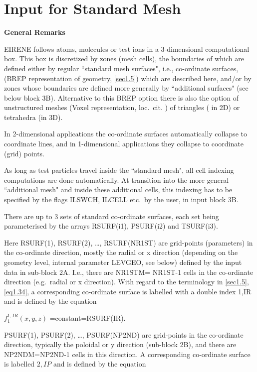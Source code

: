 \section{Input for Standard Mesh} \label{sec2.2}

\textbf{General Remarks} 

\medskip 

EIRENE follows atoms, molecules or test ions in a 3-dimensional computational
box.
This box is discretized by zones (mesh cells), the boundaries of which are
defined either by regular ``standard mesh surfaces", i.e., co-ordinate
surfaces, (\ac{BREP} representation of geometry, \cref{sec1.5}) which are
described here, and/or by zones whose boundaries are defined more generally by
``additional surfaces" (see below block 3B).
Alternative to this \ac{BREP} option there is also the option of unstructured
meshes (Voxel representation, loc.\ cit.
) of triangles ( in 2D) or tetrahedra
(in 3D).

In 2-dimensional applications the co-ordinate surfaces automatically collapse
to coordinate lines, and in 1-dimensional applications they collapse to
coordinate (grid) points.

As long as test particles travel inside the ``standard mesh", all cell indexing
computations are done automatically.
At transition into the more general ``additional mesh" and inside these
additional cells, this indexing has to be specified by the flags ILSWCH, ILCELL
etc.\ by the user, in input block 3B.

There are up to 3 sets of standard co-ordinate surfaces, each set being
parameterised by the arrays RSURF(i1), PSURF(i2) and TSURF(i3).

Here RSURF(1), RSURF(2), \dots, RSURF(NR1ST) are grid-points (parameters) in
the  co-ordinate direction, mostly the radial or x direction
(depending on the geometry level, internal parameter LEVGEO, see below) defined
by the input data in sub-block 2A.
I.e., there are NR1STM= NR1ST-1 cells in the  co-ordinate
direction (e.g.\ radial or x direction).
With regard to the terminology in \cref{sec1.5}, \cref{eq1.34}, a corresponding
co-ordinate surface is labelled with a double index 1,IR and is defined by the
equation 

$f_1^{1,IR} (x,y,z)$ =constant=RSURF(IR).

PSURF(1), PSURF(2), \dots, PSURF(NP2ND) are grid-points in the 
co-ordinate direction, typically the poloidal or y direction (sub-block 2B),
and there are NP2NDM=NP2ND-1 cells in this direction.
A corresponding co-ordinate surface is labelled $2,IP$ and is defined by the
equation 

